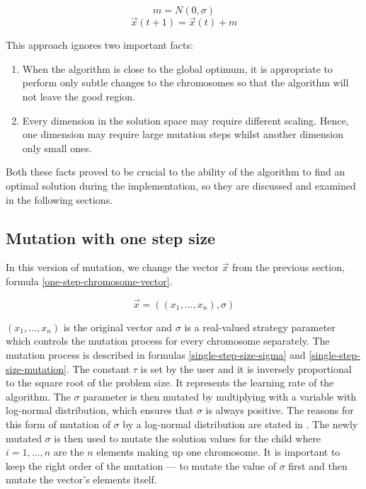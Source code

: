 \begin{equation}
\label{normal-distribution}
    m = N(0, \sigma)
\end{equation}
\begin{equation} \label{simple-mutation}
    \vec{x}(t+1) = \vec{x}(t) + m
\end{equation}

This approach ignores two important facts:
\begin{enumerate}
    \item When the algorithm is close to the global optimum, it is appropriate to perform only subtle changes to the chromosomes so that the algorithm will not leave the good region.
    \item Every dimension in the solution space may require different scaling. Hence, one dimension may require large mutation steps whilst another dimension only small ones.
\end{enumerate}

Both these facts proved to be crucial to the ability of the algorithm to find an optimal solution during the implementation, so they are discussed and examined in the following sections.

\subsection{Mutation with one step size}
In this version of mutation, we change the vector $\vec{x}$ from the previous section, formula \ref{one-step-chromosome-vector}.

\begin{equation} \label{one-step-chromosome-vector}
\vec{x} = ((x_1,...,x_n),\sigma)
\end{equation}

$(x_1,...,x_n)$ is the original vector and $\sigma$ is a real-valued strategy parameter which controls the mutation process for every chromosome separately. The mutation process is described in formulas \ref{single-step-size-sigma} and \ref{single-step-size-mutation}. The constant $\tau$ is set by the user and it is inversely proportional to the square root of the problem size. It represents the learning rate of the algorithm. The $\sigma$ parameter is then mutated by multiplying with a variable with log-normal distribution, which ensures that $\sigma$ is always positive. The reasons for this form of mutation of $\sigma$ by a log-normal distribution are stated in \cite{introduction-to-evolutionary-computing}. The newly mutated $\sigma$ is then used to mutate the solution values for the child where $i = 1,...,n$ are the $n$ elements making up one chromosome. It is important to keep the right order of the mutation --- to mutate the value of $\sigma$ first and then mutate the vector's elements itself.


